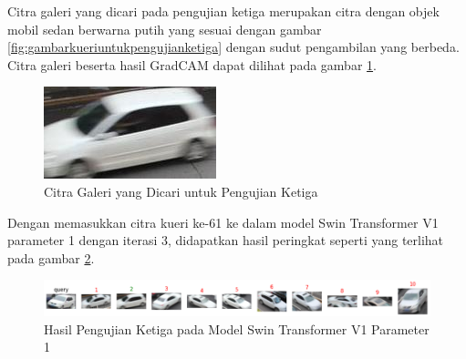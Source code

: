 Citra galeri yang dicari pada pengujian ketiga merupakan citra dengan objek mobil sedan berwarna putih 
yang sesuai dengan gambar \ref{fig:gambarkueriuntukpengujianketiga} dengan sudut pengambilan yang berbeda. 
Citra galeri beserta hasil GradCAM dapat dilihat pada gambar \ref{fig:gambargaleriuntukpengujianketiga}.

\begin{figure}[h!]
  \centering
  \includegraphics[scale=0.4]{gambar/Gal61_1120.jpg}
  \caption{Citra Galeri yang Dicari untuk Pengujian Ketiga}
  \label{fig:gambargaleriuntukpengujianketiga}
\end{figure}

Dengan memasukkan citra kueri ke-61 ke dalam model Swin Transformer V1 parameter 1 dengan iterasi 3, didapatkan hasil 
peringkat seperti yang terlihat pada gambar \ref{fig:hasilpengujianketigapadamodelswintransformerv1param1}.

\begin{figure}[h!]
  \centering
  \includegraphics[scale=0.6]{gambar/Que61V1P1IT3.png}
  \caption{Hasil Pengujian Ketiga pada Model Swin Transformer V1 Parameter 1}
  \label{fig:hasilpengujianketigapadamodelswintransformerv1param1}
\end{figure}

